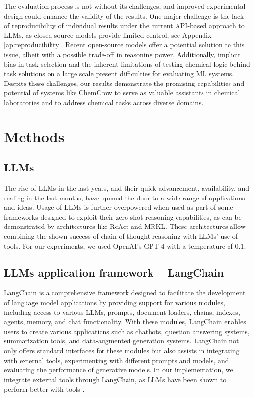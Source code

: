 \documentclass[10pt]{article}
\begin{document}
The evaluation process is not without its challenges, and improved experimental design could enhance the validity of the results. One major challenge is the lack of reproducibility of individual results under the current API-based approach to LLMs, as closed-source models provide limited control, see Appendix \ref{ap:reproducibility}. Recent open-source models\cite{touvron2023llama, vicuna2023, mukherjee2023orca} offer a potential solution to this issue, albeit with a possible trade-off in reasoning power. Additionally, implicit bias in task selection and the inherent limitations of testing chemical logic behind task solutions on a large scale present difficulties for evaluating ML systems. Despite these challenges, our results demonstrate the promising capabilities and potential of systems like ChemCrow to serve as valuable assistants in chemical laboratories and to address chemical tasks across diverse domains.


\section{Methods}
\subsection{LLMs}
The rise of LLMs in the last years, and their quick advancement, availability, and scaling in the last months, have opened the door to a wide range of applications and ideas.
Usage of LLMs is further overpowered when used as part of some frameworks designed to exploit their zero-shot reasoning capabilities, as can be demonstrated by architectures like ReAct\cite{yao2022react} and MRKL\cite{karpas2022mrkl}. These architectures allow combining the shown success of chain-of-thought\cite{wei2022chain} reasoning with LLMs' use of tools\cite{schick2023toolformer}. For our experiments, we used OpenAI's GPT-4\cite{openai2023gpt4} with a temperature of $0.1$.



\subsection{LLMs application framework -- LangChain}
LangChain \cite{langchain} is a comprehensive framework designed to facilitate the development of language model applications by providing support for various modules, including access to various LLMs, prompts, document loaders, chains, indexes, agents, memory, and chat functionality. With these modules, LangChain enables users to create various applications such as chatbots, question answering systems, summarization tools, and data-augmented generation systems. LangChain not only offers standard interfaces for these modules but also assists in integrating with external tools, experimenting with different prompts and models, and evaluating the performance of generative models. In our implementation, we integrate external tools through LangChain, as LLMs have been shown to perform better with tools \cite{schick2023toolformer, jablonka2023gpt, press2022measuring}.
\end{document}
